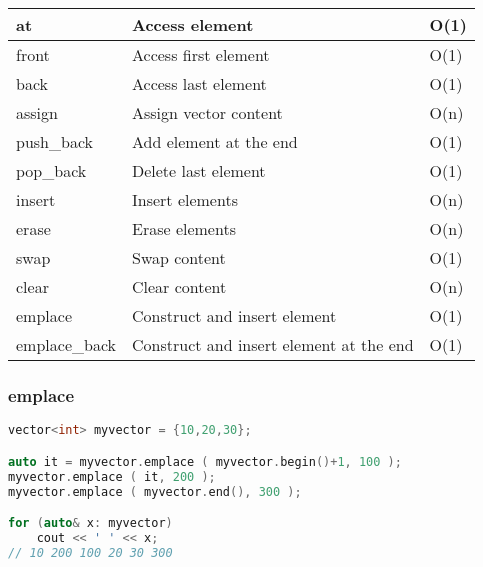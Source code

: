 \begin{center}
\begin{tabular}{||l|l|l||}
        at                        & Access element                                    & O(1)                 \\ \hline
        front                     & Access first element                              & O(1)                 \\ \hline
        back                      & Access last element                               & O(1)                 \\ \hline
        assign                    & Assign vector content                             & O(n)                 \\ \hline
        push\_back                & Add element at the end                            & O(1) \\ \hline
        pop\_back                 & Delete last element                               & O(1)                 \\ \hline
        insert                    & Insert elements                                   & O(n)                 \\ \hline
        erase                     & Erase elements                                    & O(n)                 \\ \hline
        swap                      & Swap content                                      & O(1)                 \\ \hline
        clear                     & Clear content                                     & O(n)                 \\ \hline
        emplace                   & Construct and insert element                      & O(1) \\ \hline
        emplace\_back             & Construct and insert element at the end           & O(1) \\ \hline
    \end{tabular}
\label{tab:vector_member_functions_complexity}
\end{center}

\newpage
\subsubsection{emplace}
\begin{lstlisting}[language=C++]
vector<int> myvector = {10,20,30};

auto it = myvector.emplace ( myvector.begin()+1, 100 );
myvector.emplace ( it, 200 );
myvector.emplace ( myvector.end(), 300 );

for (auto& x: myvector)
    cout << ' ' << x;
// 10 200 100 20 30 300
\end{lstlisting}

